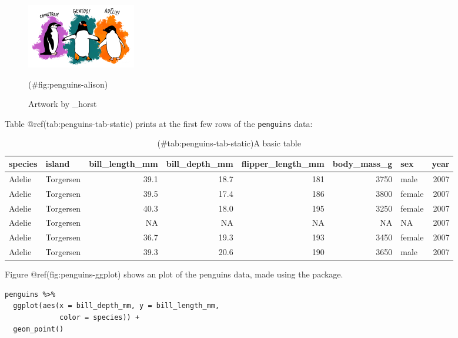 \begin{figure}
\includegraphics[width=1\linewidth,height=0.3\textheight]{penguins} \caption{Artwork by \@allison\_horst}(\#fig:penguins-alison)
\end{figure}

Table @ref(tab:penguins-tab-static) prints at the first few rows of the \texttt{penguins} data:

\begin{table}

\caption{(\#tab:penguins-tab-static)A basic table}
\centering
\fontsize{7}{9}\selectfont
\begin{tabular}[t]{l|l|r|r|r|r|l|r}
\hline
species & island & bill\_length\_mm & bill\_depth\_mm & flipper\_length\_mm & body\_mass\_g & sex & year\\
\hline
Adelie & Torgersen & 39.1 & 18.7 & 181 & 3750 & male & 2007\\
\hline
Adelie & Torgersen & 39.5 & 17.4 & 186 & 3800 & female & 2007\\
\hline
Adelie & Torgersen & 40.3 & 18.0 & 195 & 3250 & female & 2007\\
\hline
Adelie & Torgersen & NA & NA & NA & NA & NA & 2007\\
\hline
Adelie & Torgersen & 36.7 & 19.3 & 193 & 3450 & female & 2007\\
\hline
Adelie & Torgersen & 39.3 & 20.6 & 190 & 3650 & male & 2007\\
\hline
\end{tabular}
\end{table}

Figure @ref(fig:penguins-ggplot) shows an plot of the penguins data, made using the  package.

\begin{verbatim}
penguins %>% 
  ggplot(aes(x = bill_depth_mm, y = bill_length_mm, 
             color = species)) + 
  geom_point()
\end{verbatim}

